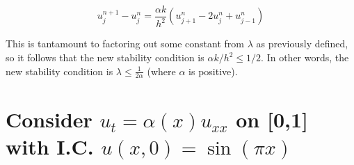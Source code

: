\documentclass[11pt]{amsart}
\begin{document}
\begin{equation} 
u_j^{n+1} - u_j^n = \frac{\alpha k }{h^2}  (u_{j+1}^n - 2u_j^n + u_{j-1}^n)
\end{equation} 

This is tantamount to factoring out some constant from $\lambda$ as previously defined, so it follows that the new stability condition is  $\alpha k/h^2 \le 1/2$. In other words, the new stability condition is  $\lambda \le \frac{1}{2\alpha}$ (where $\alpha$ is positive). 


\section{Consider $u_t = \alpha(x) u_{xx}$ on [0,1] with I.C. $u(x,0)= \sin(\pi x)$ }
\end{document}
